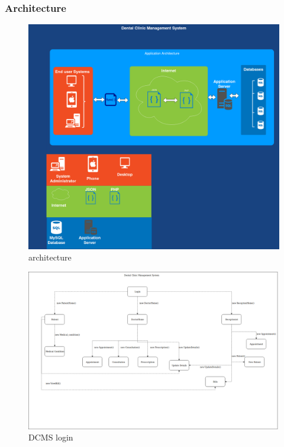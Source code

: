 \documentclass[11 pt]{article}
\begin{document}
    \subsubsection{Architecture}
    
    \begin{figure}[h]
    \centering
    
    \includegraphics[width=1.2\linewidth]{architecture.png}
    \caption{architecture}
    \end{figure}
    \begin{figure}[h]
    
    \includegraphics[width=1.2\linewidth, left]{Logical_view.png}
    \caption{DCMS login}
    \label{fig:login}
    \end{figure}
    \newpage
\end{document}
